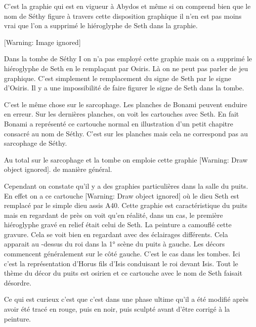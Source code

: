 \documentclass{article}
\begin{document}
C’est la graphie qui est en vigueur à Abydos et même si on comprend bien
que le nom de Séthy figure à travers cette disposition graphique il
n’en est pas moins vrai que l’on a supprimé le hiéroglyphe de Seth dans
la graphie.

  [Warning: Image ignored] %
 

Dans la tombe de Séthy I  on n’a pas employé cette graphie mais on a
supprimé le hiéroglyphe de Seth en le remplaçant par Osiris. Là on ne
peut pas parler de jeu graphique. C’est simplement le remplacement du
signe de Seth par le signe d’Osiris. Il y a une impossibilité de faire
figurer le signe de Seth dans la tombe.

C’est le même chose sur le sarcophage. Les planches de Bonami peuvent
enduire en erreur. Sur les dernières planches, on voit les cartouches
avec Seth. En fait Bonami a représenté ce cartouche normal en
illustration d’un petit chapitre consacré au nom de Séthy. C’est sur
les planches mais cela ne correspond pas au sarcophage de Séthy.

Au total sur le sarcophage et la tombe on emploie cette graphie 
[Warning: Draw object ignored].  de manière général.

\begin{figure}[htp]

\end{figure}
Cependant on constate qu’il y a des graphies particulières dans la salle
du puits. En effet on a ce cartouche [Warning: Draw object ignored]  où
le dieu Seth est remplacé par le simple dieu assis A40. Cette graphie
est caractéristique du puits mais en regardant de près on voit qu’en
réalité, dans un cas, le première hiéroglyphe gravé en relief était
celui de Seth. La peinture a camouflé cette gravure. Cela se voit bien
en regardant avec des éclairages différents. Cela apparait au {}-dessus
du roi dans la 1° scène du puits à gauche. Les décors commencent
généralement sur le côté  gauche. C’est le cas dans les tombes. Ici
c’est la représentation d’Horus fils d’Isis conduisant le roi devant
Isis. Tout le thème du décor du puits est osirien et ce cartouche avec
le nom de Seth faisait désordre.

\begin{figure}[htp]

\end{figure}
Ce qui est curieux c’est que c’est dans une phase ultime qu’il a été
modifié après avoir été tracé en rouge, puis en noir, puis sculpté
avant d’être corrigé à la peinture.
\end{document}
